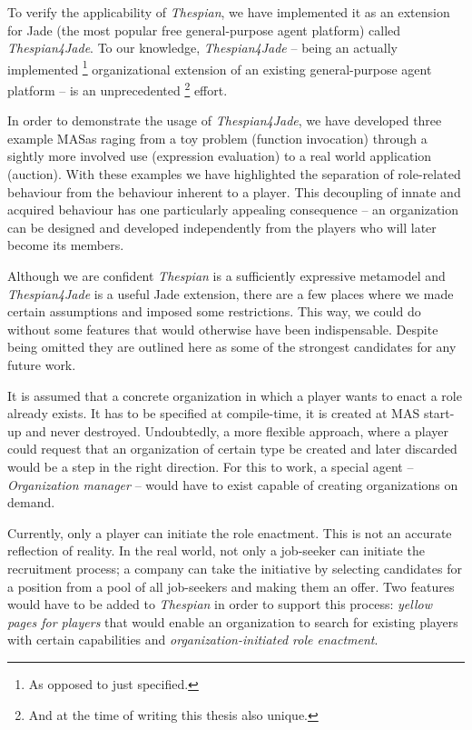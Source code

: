 To verify the applicability of \textit{Thespian}, we have implemented it as an extension for Jade (the most popular free general-purpose agent platform) called \textit{Thespian4Jade}.
To our knowledge, \textit{Thespian4Jade} -- being an actually implemented
\footnote{As opposed to just specified.}
organizational extension of an existing general-purpose agent platform -- is an unprecedented
\footnote{And at the time of writing this thesis also unique.}
effort.

In order to demonstrate the usage of \textit{Thespian4Jade}, we have developed three example MASas raging from a toy problem (function invocation) through a sightly more involved use (expression evaluation) to a real world application (auction).
With these examples we have highlighted the separation of role-related behaviour from the behaviour inherent to a player.
This decoupling of innate and acquired behaviour has one particularly appealing consequence -- an organization can be designed and developed independently from the players who will later become its members. 


Although we are confident \textit{Thespian} is a sufficiently expressive metamodel and \textit{Thespian4Jade} is a useful Jade extension, there are a few places where we made certain assumptions and imposed some restrictions.
This way, we could do without some features that would otherwise have been indispensable.
Despite being omitted they are outlined here as some of the strongest candidates for any future work.

It is assumed that a concrete organization in which a player wants to enact a role already exists.
It has to be specified at compile-time, it is created at MAS start-up and never destroyed.
Undoubtedly, a more flexible approach, where a player could request that an organization of certain type be created and later discarded would be a step in the right direction.
For this to work, a special agent -- \textit{Organization manager} -- would have to exist capable of creating organizations on demand.

Currently, only a player can initiate the role enactment.
This is not an accurate reflection of reality.
In the real world, not only a job-seeker can initiate the recruitment process; a company can take the initiative by selecting candidates for a position from a pool of all job-seekers and making them an offer.
Two features would have to be added to \textit{Thespian} in order to support this process: \textit{yellow pages for players} that would enable an organization to search for existing players with certain capabilities and \textit{organization-initiated role enactment}.

